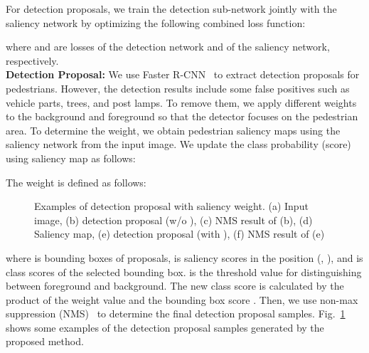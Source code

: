 \documentclass[journal]{IEEEtran}
\begin{document}
For detection proposals, we train the detection sub-network jointly with the saliency network by optimizing the following combined loss function:



where  and  are losses of the detection network and of the saliency network, respectively. \\

\textbf{Detection Proposal:} We use Faster R-CNN~\cite{ren2015faster} to extract detection proposals for pedestrians. However, the detection results include some false positives such as vehicle parts, trees, and post lamps. To remove them, we apply different weights to the background and foreground so that the detector focuses on the pedestrian area. To determine the weight, we obtain pedestrian saliency maps using the saliency network from the input image. We update the class probability (score) using saliency map as follows:



The weight  is defined as follows:



\begin{figure}[t]
\centering
{}

\caption{Examples of detection proposal with saliency weight. (a) Input image, (b) detection proposal (w/o ), (c) NMS result of (b), (d) Saliency map, (e) detection proposal (with ), (f) NMS result of (e) }
\label{fig:withSal}
\end{figure}

where  is bounding boxes of proposals,  is saliency scores in the position (, ), and  is class scores of the selected bounding box.  is the threshold value for distinguishing between foreground and background. The new class score  is calculated by the product of the weight value  and the bounding box score . Then, we use non-max suppression (NMS)~\cite{ren2015faster} to determine the final detection proposal samples. Fig.~\ref{fig:withSal} shows some examples of the detection proposal samples generated by the proposed method.
\end{document}
